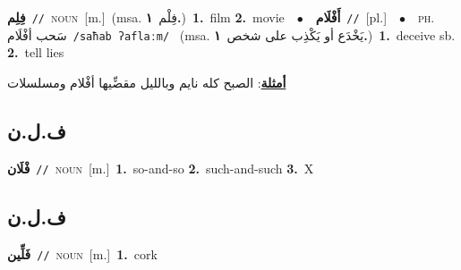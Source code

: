 \documentclass[10pt,a4paper,twoside]{article} %
\begin{document}
\begin{multicols}{2}
{\setlength\topsep{0pt}\textbf{\foreignlanguage{arabic}{فِلِم}}\ {\color{gray}\texttt{//}\color{black}}\ \textsc{noun}\ [m.]\ \color{gray}(msa. \foreignlanguage{arabic}{فِلْم}~\foreignlanguage{arabic}{\textbf{١.}})\color{black}\ \textbf{1.}~film  \textbf{2.}~movie\ \ $\bullet$\ \ \setlength\topsep{0pt}\textbf{\foreignlanguage{arabic}{أَفْلَام}}\ {\color{gray}\texttt{//}\color{black}}\ [pl.]\ \ $\bullet$\ \ \textsc{ph.} \color{gray} \foreignlanguage{arabic}{سَحب أفْلَام}\color{black}\ {\color{gray}\texttt{/{\sffamily saħab ʔaflaːm}/}\color{black}}\ \color{gray} (msa. \foreignlanguage{arabic}{يَخْدَع أو يَكْذِب على شخص}~\foreignlanguage{arabic}{\textbf{١.}})\color{black}\ \textbf{1.}~deceive sb.  \textbf{2.}~tell lies\  \begin{flushright}\color{gray}\foreignlanguage{arabic}{\textbf{\underline{\foreignlanguage{arabic}{أمثلة}}}: الصبح كله نايم وبالليل مقضِّيها أفْلام ومسلسلات}\end{flushright}\color{black}} \vspace{2mm}

\vspace{-3mm}
\subsection*{\color{blue}\foreignlanguage{arabic}{ف.ل.ن}\color{blue}{}} 

{\setlength\topsep{0pt}\textbf{\foreignlanguage{arabic}{فْلَان}}\ {\color{gray}\texttt{//}\color{black}}\ \textsc{noun}\ [m.]\ \textbf{1.}~so-and-so  \textbf{2.}~such-and-such  \textbf{3.}~X\ } \vspace{2mm}

\vspace{-3mm}
\subsection*{\color{blue}\foreignlanguage{arabic}{ف.ل.ن}\color{blue}{ (ntws)}} 

{\setlength\topsep{0pt}\textbf{\foreignlanguage{arabic}{فَلِّين}}\ {\color{gray}\texttt{//}\color{black}}\ \textsc{noun}\ [m.]\ \textbf{1.}~cork\ } \vspace{2mm}


\end{multicols}
\end{document}
